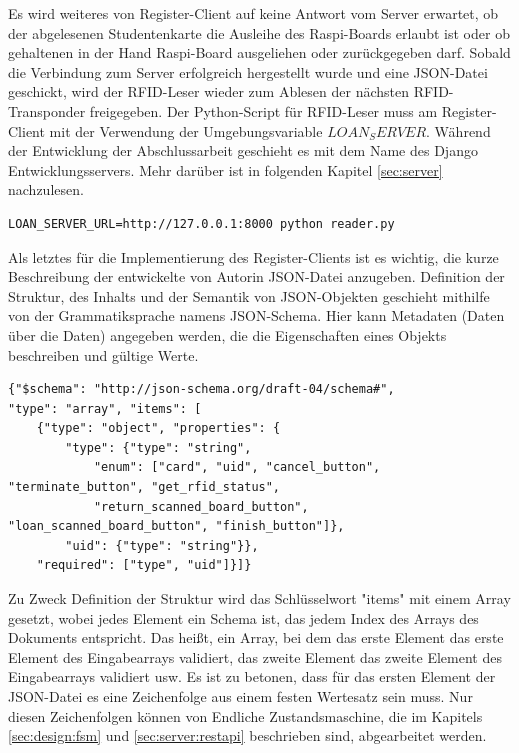 Es wird weiteres von Register-Client auf keine Antwort vom Server erwartet, ob der abgelesenen Studentenkarte die Ausleihe des Raspi-Boards erlaubt ist oder ob gehaltenen in der Hand Raspi-Board ausgeliehen oder zurückgegeben darf. Sobald die Verbindung zum Server erfolgreich hergestellt wurde und eine JSON-Datei geschickt, wird der RFID-Leser wieder zum Ablesen der nächsten RFID-Transponder freigegeben. Der Python-Script für RFID-Leser muss am Register-Client mit der Verwendung der Umgebungsvariable $LOAN_SERVER$. Während der Entwicklung der Abschlussarbeit geschieht es mit dem Name des Django Entwicklungsservers. Mehr darüber ist in folgenden Kapitel \ref{sec:server} nachzulesen.
\begin{lstlisting}
LOAN_SERVER_URL=http://127.0.0.1:8000 python reader.py
\end{lstlisting}
Als letztes für die Implementierung des Register-Clients ist es wichtig, die kurze Beschreibung der entwickelte von Autorin JSON-Datei anzugeben. Definition der Struktur, des Inhalts und der Semantik von JSON-Objekten geschieht mithilfe von der Grammatiksprache namens JSON-Schema. Hier kann Metadaten (Daten über die Daten) angegeben werden, die die Eigenschaften eines Objekts beschreiben und gültige Werte. 

\begin{lstlisting}
{"$schema": "http://json-schema.org/draft-04/schema#",
"type": "array", "items": [
	{"type": "object", "properties": {
		"type": {"type": "string",
			"enum": ["card", "uid", "cancel_button", "terminate_button", "get_rfid_status",
			"return_scanned_board_button", "loan_scanned_board_button", "finish_button"]},
		"uid": {"type": "string"}},
	"required": ["type", "uid"]}]}
\end{lstlisting}

Zu Zweck Definition der Struktur wird das Schlüsselwort "items" mit einem Array gesetzt, wobei jedes Element ein Schema ist, das jedem Index des Arrays des Dokuments entspricht. Das heißt, ein Array, bei dem das erste Element das erste Element des Eingabearrays validiert, das zweite Element das zweite Element des Eingabearrays validiert usw\cite{website:14}. Es ist zu betonen, dass für das ersten Element der JSON-Datei es eine Zeichenfolge aus einem festen Wertesatz sein muss. Nur diesen Zeichenfolgen können von Endliche Zustandsmaschine, die im Kapitels \ref{sec:design:fsm} und \ref{sec:server:restapi} beschrieben sind, abgearbeitet werden. 

